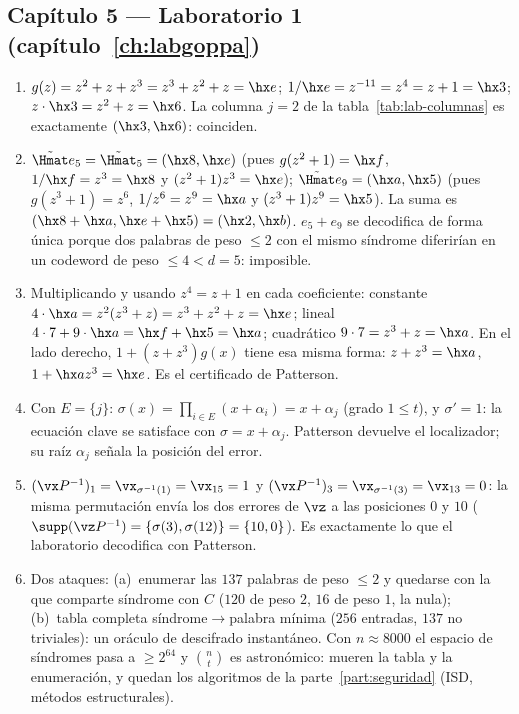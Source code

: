 \subsection*{Capítulo 5 --- Laboratorio 1
(capítulo~\ref{ch:labgoppa})}

\begin{enumerate}[leftmargin=1.9em,itemsep=4pt]
  \item $g(z)=z^2+z+z^3=z^3+z^2+z=\hx e$; $1/\hx e=z^{-11}=z^4
        =z+1=\hx3$; $z\cdot\hx3=z^2+z=\hx6$. La columna $j=2$ de
        la tabla~\ref{tab:lab-columnas} es exactamente $(\hx3,\hx6)$:
        coinciden.
  \item $\tilde{\Hmat}e_5=\tilde{\Hmat}_5=(\hx8,\hx e)$ (pues
        $g(z^2+1)=\hx f$, $1/\hx f=z^3=\hx8$ y
        $(z^2+1)z^3=\hx e$); $\tilde{\Hmat}e_9=(\hx a,\hx5)$ (pues
        $g(z^3+1)=z^6$, $1/z^6=z^9=\hx a$ y
        $(z^3+1)z^9=\hx5$). La suma es
        $(\hx8+\hx a,\hx e+\hx5)=(\hx2,\hx b)$. $e_5+e_9$ se decodifica
        de forma única porque dos palabras de peso $\le2$ con el
        mismo síndrome diferirían en un codeword de peso
        $\le4<d=5$: imposible.
  \item Multiplicando y usando $z^4=z+1$ en cada coeficiente:
        constante $4\cdot\hx a=z^2(z^3+z)=z^3+z^2+z=\hx e$; lineal
        $4\cdot7+9\cdot\hx a=\hx f+\hx5=\hx a$; cuadrático
        $9\cdot7=z^3+z=\hx a$. En el lado derecho,
        $1+(z+z^3)g(x)$ tiene esa misma forma: $z+z^3=\hx a$,
        $1+\hx a z^3=\hx e$. Es el certificado de Patterson.
  \item Con $E=\{j\}$: $\sigma(x)=\prod_{i\in E}(x+\alpha_i)
        =x+\alpha_j$ (grado $1\le t$), y $\sigma'=1$: la ecuación
        clave se satisface con $\sigma=x+\alpha_j$. Patterson
        devuelve el localizador; su raíz $\alpha_j$ señala la
        posición del error.
  \item $(\vx P^{-1})_1=\vx_{\sigma^{-1}(1)}=\vx_{15}=1$ y
        $(\vx P^{-1})_3=\vx_{\sigma^{-1}(3)}=\vx_{13}=0$: la misma
        permutación envía los dos errores de $\vz$ a las posiciones
        $0$ y $10$ ($\supp(\vz P^{-1})=\{\sigma(3),\sigma(12)\}
        =\{10,0\}$). Es exactamente lo que el laboratorio decodifica
        con Patterson.
  \item Dos ataques: (a)~enumerar las $137$ palabras de peso $\le2$
        y quedarse con la que comparte síndrome con $C$
        ($120$ de peso $2$, $16$ de peso $1$, la nula);
        (b)~tabla completa síndrome$\to$palabra mínima ($256$
        entradas, $137$ no triviales): un oráculo de descifrado
        instantáneo. Con $n\approx8000$ el espacio de síndromes pasa
        a $\ge2^{64}$ y $\binom{n}{t}$ es astronómico: mueren la
        tabla y la enumeración, y quedan los algoritmos de la
        parte~\ref{part:seguridad} (ISD, métodos estructurales).
\end{enumerate}

